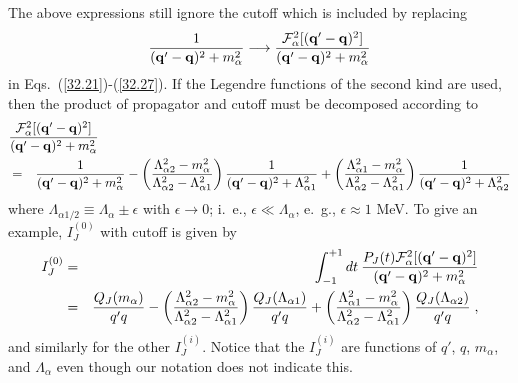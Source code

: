 The above expressions still ignore the cutoff
which is included by replacing
\begin{equation}
\frac{1}{({\bf  q}'-{\bf  q})^2+m^2_\alpha}
\longrightarrow
\frac{{\cal F}^2_\alpha[({\bf  q}'-{\bf  q})^2]}
{({\bf  q}'-{\bf  q})^2+m^2_\alpha}
\end{equation}
in Eqs.~(\ref{32.21})-(\ref{32.27}).
If the Legendre functions of the second kind are used,
then the product of propagator and cutoff must be decomposed according to
\begin{eqnarray}
\lefteqn{ \frac{{\cal F}^2_\alpha[({\bf  q}'-{\bf  q})^2]}
{({\bf  q}'-{\bf  q})^2+m^2_\alpha}  } \nonumber \\
 & = &
\frac{1}{({\bf  q}'-{\bf  q})^2+m^2_\alpha}
- 
\left(
\frac{\Lambda^2_{\alpha 2} - m^2_\alpha}
{\Lambda^2_{\alpha 2} - \Lambda^2_{\alpha 1}}
\right)
\frac{1}{({\bf  q}'-{\bf  q})^2+\Lambda^2_{\alpha 1}}
+
\left(
\frac{\Lambda^2_{\alpha 1} - m^2_\alpha}
{\Lambda^2_{\alpha 2} - \Lambda^2_{\alpha 1}}
\right)
\frac{1}{({\bf  q}'-{\bf  q})^2+\Lambda^2_{\alpha 2}}
\end{eqnarray}
where
$\Lambda_{\alpha 1/2} \equiv \Lambda_\alpha \pm \epsilon$
with $\epsilon \rightarrow 0$; i.~e., $\epsilon \ll \Lambda_\alpha$, 
e.~g., $\epsilon \approx 1$ MeV.
To give an example, $I^{(0)}_J$ with cutoff is given by
\begin{eqnarray}
 I^{(0)}_J  & = & 
\int_{-1}^{+1} dt\: 
\frac{P_J(t)
{\cal F}^2_\alpha[({\bf  q}'-{\bf  q})^2] 
}
{({\bf  q}'-{\bf  q})^2+m^2_\alpha}
\\
 & = & 
\frac{Q_J(m_\alpha)}{q'q}
- 
\left(
\frac{\Lambda^2_{\alpha 2} - m^2_\alpha}
{\Lambda^2_{\alpha 2} - \Lambda^2_{\alpha 1}}
\right)
\frac{Q_J(\Lambda_{\alpha 1})}{q'q}
+
\left(
\frac{\Lambda^2_{\alpha 1} - m^2_\alpha}
{\Lambda^2_{\alpha 2} - \Lambda^2_{\alpha 1}}
\right)
\frac{Q_J(\Lambda_{\alpha 2})}{q'q}
\; ,
\end{eqnarray}
and similarly for the other $I^{(i)}_J$.
Notice that the $I^{(i)}_J$ are functions of
$q'$, $q$, $m_\alpha$, and $\Lambda_\alpha$
even though our notation does not indicate this. 
  



